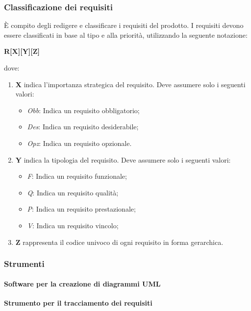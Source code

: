 \documentclass[../NormeProgetto.tex]{subfiles}
\begin{document}
		\subsubsection{Classificazione dei requisiti}
		È compito degli \analisti redigere e classificare i requisiti del prodotto.  I requisiti devono essere classificati in base al tipo e alla priorità, utilizzando la seguente notazione:
		\begin{center}\textbf{R[X][Y][Z]}\end{center} dove:
			\begin{enumerate}
				\item \textbf{X} indica l'importanza strategica del requisito. Deve assumere solo i seguenti valori:
					\begin{itemize}
						\item \textit{Obb}: Indica un requisito obbligatorio;
						\item \textit{Des}: Indica un requisito desiderabile;
						\item \textit{Opz}: Indica un requisito opzionale.
					\end{itemize}
				\item \textbf{Y} indica la tipologia del requisito. Deve assumere solo i seguenti valori:
					\begin{itemize}
						\item \textit{F}: Indica un requisito funzionale;
						\item \textit{Q}: Indica un requisito qualità;
						\item \textit{P}: Indica un requisito prestazionale;
						\item \textit{V}: Indica un requisito vincolo;
					\end{itemize}
				\item \textbf{Z} rappresenta il codice univoco di ogni requisito in forma gerarchica.
			\end{enumerate}
		\subsubsection{Strumenti}
			\paragraph{Software per la creazione di diagrammi UML}
			\paragraph{Strumento per il tracciamento dei requisiti}
\end{document}

